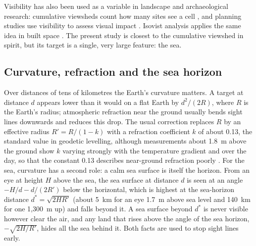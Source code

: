 \documentclass[11pt,a4paper]{article}
\begin{document}
Visibility has also been used as a variable in landscape and archaeological research: cumulative viewsheds count how many sites see a cell \citep{wheatley1995}, and planning studies use visibility to assess visual impact \citep{bishop2003}. Isovist analysis applies the same idea in built space \citep{benedikt1979}. The present study is closest to the cumulative viewshed in spirit, but its target is a single, very large feature: the sea.

\subsection{Curvature, refraction and the sea horizon}
Over distances of tens of kilometres the Earth's curvature matters. A target at distance $d$ appears lower than it would on a flat Earth by $d^2/(2R)$, where $R$ is the Earth's radius; atmospheric refraction near the ground usually bends sight lines downwards and reduces this drop. The usual correction replaces $R$ by an effective radius $R' = R/(1-k)$ with a refraction coefficient $k$ of about 0.13, the standard value in geodetic levelling, although measurements about 1.8~m above the ground show $k$ varying strongly with the temperature gradient and over the day, so that the constant 0.13 describes near-ground refraction poorly \citep{hirt2010}. For the sea, curvature has a second role: a calm sea surface is itself the horizon. From an eye at height $H$ above the sea, the sea surface at distance $d$ is seen at an angle $-H/d - d/(2R')$ below the horizontal, which is highest at the sea-horizon distance $d^\ast = \sqrt{2HR'}$ (about 5~km for an eye 1.7~m above sea level and 140~km for one 1,300~m up) and falls beyond it. A sea surface beyond $d^\ast$ is never visible however clear the air, and any land that rises above the angle of the sea horizon, $-\sqrt{2H/R'}$, hides all the sea behind it. Both facts are used to stop sight lines early.
\end{document}
